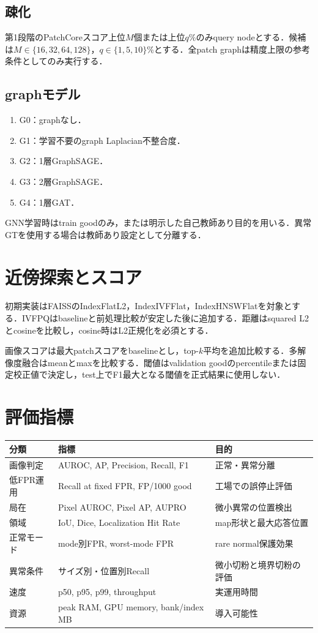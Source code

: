 \documentclass[a4paper,11pt]{ltjsarticle}
\begin{document}
\subsection{疎化}
第1段階のPatchCoreスコア上位$M$個または上位$q\%$のみquery nodeとする．候補は$M\in\{16,32,64,128\}$，$q\in\{1,5,10\}$\%とする．全patch graphは精度上限の参考条件としてのみ実行する．

\subsection{graphモデル}
\begin{enumerate}
  \item G0：graphなし．
  \item G1：学習不要のgraph Laplacian不整合度．
  \item G2：1層GraphSAGE．
  \item G3：2層GraphSAGE．
  \item G4：1層GAT．
\end{enumerate}
GNN学習時はtrain goodのみ，または明示した自己教師あり目的を用いる．異常GTを使用する場合は教師あり設定として分離する．

\section{近傍探索とスコア}
初期実装はFAISSのIndexFlatL2，IndexIVFFlat，IndexHNSWFlatを対象とする．IVFPQはbaselineと前処理比較が安定した後に追加する．距離はsquared L2とcosineを比較し，cosine時はL2正規化を必須とする．

画像スコアは最大patchスコアをbaselineとし，top-$k$平均を追加比較する．多解像度融合はmeanとmaxを比較する．閾値はvalidation goodのpercentileまたは固定校正値で決定し，test上でF1最大となる閾値を正式結果に使用しない．

\section{評価指標}
\begin{longtable}{L{35mm}L{47mm}Y}
\toprule
分類 & 指標 & 目的 \\
\midrule
画像判定 & AUROC, AP, Precision, Recall, F1 & 正常・異常分離 \\
低FPR運用 & Recall at fixed FPR, FP/1000 good & 工場での誤停止評価 \\
局在 & Pixel AUROC, Pixel AP, AUPRO & 微小異常の位置検出 \\
領域 & IoU, Dice, Localization Hit Rate & map形状と最大応答位置 \\
正常モード & mode別FPR, worst-mode FPR & rare normal保護効果 \\
異常条件 & サイズ別・位置別Recall & 微小切粉と境界切粉の評価 \\
速度 & p50, p95, p99, throughput & 実運用時間 \\
資源 & peak RAM, GPU memory, bank/index MB & 導入可能性 \\
\bottomrule
\end{longtable}
\end{document}
